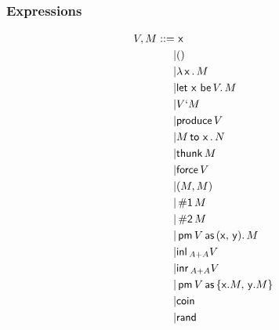 \documentclass{article}
\newcommand{\x}{\mathsf{\,x\,}}
\newcommand{\y}{\mathsf{\,y\,}}
\newcommand{\letc}{\mathsf{let \,}}
\newcommand{\toc}{\mathsf{\, to \,}}
\newcommand{\rand}{\mathsf{rand\,}}
\newcommand{\coin}{\mathsf{coin\,}}
\newcommand{\inl}{\mathsf{inl\,}}
\newcommand{\inr}{\mathsf{inr\,}}
\newcommand{\1}{\mathsf{\,\#1\,}}
\newcommand{\2}{\mathsf{\,\#2\,}}
\newcommand{\force}{\mathsf{force \,}}
\newcommand{\be}{\mathsf{\, be \,}}
\newcommand{\thunk}{\mathsf{thunk \,}}
\newcommand{\produce}{\mathsf{produce \,}}
\newcommand{\pmc}{\mathsf{\, pm \,}}
\newcommand{\as}{\mathsf{\, as \,}}
\begin{document}
\subsubsection*{Expressions}
	\begin{equation*}
		\begin{split}
			V, M ::=\,
			 & \x \\
			|& () \\
			|& \lambda \x.\, M \\
			|& \letc \x \be V.\, M \\
			|& V` M \\
			|& \produce V \\
			|& M \toc \x.\, N \\
			|& \thunk M \\
			|& \force V \\
			|& (M, M) \\
			|& \1 M \\
			|& \2 M \\
			|& \pmc V \as (\!\x\!,\y\!).\, M \\
			|& \inl_{A + A} V \\
			|& \inr_{A + A} V \\
			|& \pmc V \as \{\!\x\!. M, \y\!. M\} \\
			|& \coin \\
			|& \rand \\
		\end{split}
	\end{equation*}

\newpage
\end{document}
